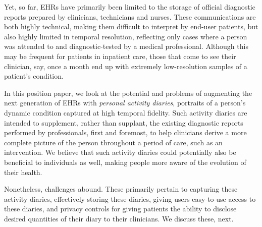 \documentclass{chi-ext}
\begin{document}




Yet, so far, EHRs have primarily been limited to the storage of
official diagnostic reports prepared by clinicians, technicians and
nurses.  These communications are both highly technical, making them
difficult to interpret by end-user patients, but also highly limited
in temporal resolution, reflecting only cases where a person was
attended to and diagnostic-tested by a medical professional.  Although
this may be frequent for patients in inpatient care, those that come
to see their clinician, say, once a month end up with extremely
low-resolution samples of a patient's condition.

In this position paper, we look at the potential and problems of
augmenting the next generation of EHRs with \emph{personal activity
  diaries}, portraits of a person's dynamic condition captured at high
temporal fidelity.  Such activity diaries are intended to supplement,
rather than supplant, the existing diagnostic reports performed by
professionals, first and foremost, to help clinicians derive a more
complete picture of the person throughout a period of care, such as an
intervention.  We believe that such activity diaries could potentially
also be beneficial to individuals as well, making people more aware of
the evolution of their health.

Nonetheless, challenges abound. These primarily pertain to capturing
these activity diaries, effectively storing these diaries, giving
users easy-to-use access to these diaries, and privacy controls for
giving patients the ability to disclose desired quantities of their
diary to their clinicians.  We discuss these, next.
\end{document}
